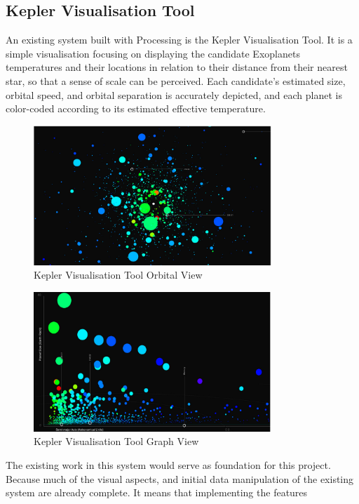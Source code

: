 \subsection{Kepler Visualisation Tool}
An existing system built with Processing is the Kepler Visualisation
Tool\cite{kepler_github, kepler_article}. It is a simple visualisation focusing
on displaying the candidate Exoplanets temperatures and their locations in
relation to their distance from their nearest star, so that a sense of scale can
be perceived. Each candidate’s estimated size, orbital speed, and orbital
separation is accurately depicted, and each planet is color-coded according to
its estimated effective temperature.
\begin{figure}[H]
  \centering
      \includegraphics[width=0.8\textwidth]{images/kepler_orbital.jpg}
  \caption{Kepler Visualisation Tool Orbital View}
\end{figure}
\begin{figure}[H]
  \centering
      \includegraphics[width=0.8\textwidth]{images/kepler_graph.jpg}
  \caption{Kepler Visualisation Tool Graph View}
\end{figure}
The existing work in this system would serve as foundation for this project.
Because much of the visual aspects, and initial data manipulation of the
existing system are already complete. It means that implementing the features
